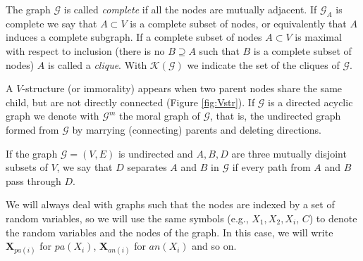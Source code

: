 \documentclass[11pt,a4paper, twoside]{book}
\newcommand{\bX}{\mathbf{X}}
\begin{document}
The graph $\mathcal{G}$ is called \textit{complete} if all the nodes are mutually adjacent. If $\mathcal{G}_A$ is complete we say that $A  \subset V$ is a complete subset of nodes, or equivalently that $A$ induces a complete subgraph.
If a complete subset of nodes $A\subset V$ is maximal with respect to inclusion (there is no $B\supseteq A$ such that $B$ is a complete subset of nodes) $A$ is called a \textit{clique}. With $\mathcal{K}(\mathcal{G})$ we indicate the set of the cliques of $\mathcal{G}$.

A $V$-structure (or immorality) appears when two parent nodes share the same child, but are not directly connected (Figure \ref{fig:Vstr}).
If $\mathcal{G}$ is a directed acyclic graph we denote with $\mathcal{G}^m$ the moral graph of $\mathcal{G}$, that is, the undirected graph formed from $\mathcal{G}$ by marrying (connecting) parents and deleting directions.

If the graph $\mathcal{G} = (V,E)$ is undirected and $A,B,D$ are three mutually disjoint subsets of $V$, we say that $D$ separates $A$ and $B$ in $\mathcal{G}$ if every path from $A$ and $B$ pass through $D$.

We will always deal with graphs such that the nodes are indexed by a set of random variables, so we will use the same symbols (e.g., $X_1, X_2, X_i$, $C$) to denote the random variables and the nodes of the graph. In this case, we will write $\bX_{pa(i)}$ for $pa(X_i)$, $\bX_{an(i)}$ for $an(X_i)$ and so on.  
\end{document}
